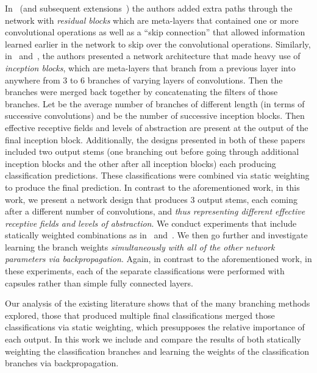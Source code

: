 \documentclass{article}
\begin{document}
In~\cite{He2015} (and subsequent extensions~\cite{Srivastava2015}\cite{Xie2017}\cite{Jgou2017}\cite{Zhang2020}) the authors added extra paths through the network with \textit{residual blocks} which are meta-layers that contained one or more convolutional operations as well as a ``skip connection'' that allowed information learned earlier in the network to skip over the convolutional operations.  Similarly, in~\cite{Szegedy2015a} and~\cite{Szegedy2015b}, the authors presented a network architecture that made heavy use of \textit{inception blocks}, which are meta-layers that branch from a previous layer into anywhere from 3 to 6 branches of varying layers of convolutions.  Then the branches were merged back together by concatenating the filters of those branches.  Let  be the average number of branches of different length (in terms of successive convolutions) and  be the number of successive inception blocks.  Then  effective receptive fields and levels of abstraction are present at the output of the final inception block.  Additionally, the designs presented in both of these papers included two output stems (one branching out before going through additional inception blocks and the other after all inception blocks) each producing classification predictions.  These classifications were combined via static weighting to produce the final prediction.  In contrast to the aforementioned work, in this work, we present a network design that produces 3 output stems, each coming after a different number of convolutions, and \textit{thus representing different effective receptive fields and levels of abstraction}.  We conduct experiments that include statically weighted combinations as in~\cite{Szegedy2015a} and~\cite{Szegedy2015b}.  We then go further and investigate learning the branch weights \textit{simultaneously with all of the other network parameters via backpropagation}.  Again, in contrast to the aforementioned work, in these experiments, each of the separate classifications were performed with capsules rather than simple fully connected layers.

Our analysis of the existing literature shows that of the many branching methods explored, those that produced multiple final classifications merged those classifications via static weighting, which presupposes the relative importance of each output.  In this work we include and compare the results of both statically weighting the classification branches and learning the weights of the classification branches via backpropagation.
\end{document}
